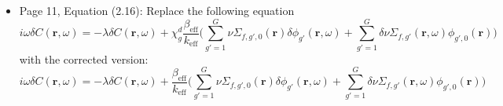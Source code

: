 \documentclass[12pt]{article}
\begin{document}
\begin{itemize}
    \item Page 11, Equation (2.16): Replace the  following equation
\begin{equation*}
        i \omega \delta C(\textbf{r}, \omega) = - \lambda \delta C(\textbf{r}, \omega) + \chi^d_g \frac{\beta_{\text{eff}}}{k_{\text{eff}}}\biggl(\sum_{g' = 1}^{G} \nu \Sigma_{f,g',0}(\textbf{r}) \delta \phi_{g'}(\textbf{r}, \omega) + \sum_{g' = 1}^{G} \delta \nu \Sigma_{f,g'}(\textbf{r}, \omega) \phi_{g',0}(\textbf{r}) \biggr)
\end{equation*}
    with the corrected version:
\begin{equation*}
        i \omega \delta C(\textbf{r}, \omega) = - \lambda \delta C(\textbf{r}, \omega) + \frac{\beta_{\text{eff}}}{k_{\text{eff}}}\biggl(\sum_{g' = 1}^{G} \nu \Sigma_{f,g',0}(\textbf{r}) \delta \phi_{g'}(\textbf{r}, \omega) + \sum_{g' = 1}^{G} \delta \nu \Sigma_{f,g'}(\textbf{r}, \omega) \phi_{g',0}(\textbf{r}) \biggr)
\end{equation*}
    
\end{itemize}

\vfill
\end{document}
